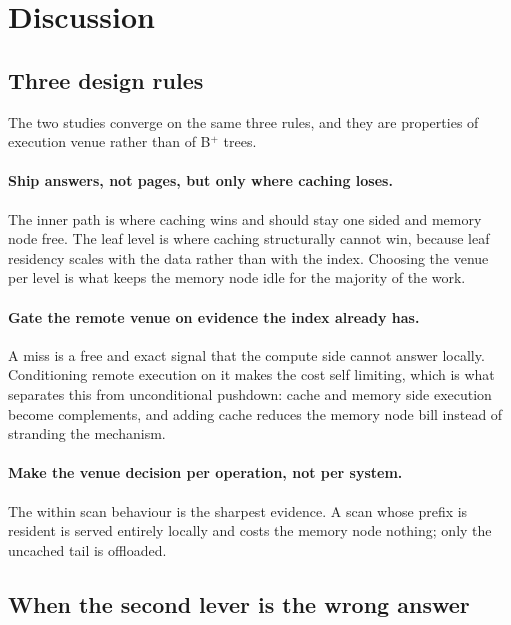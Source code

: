 \documentclass[sigconf,nonacm]{acmart}
\begin{document}
\section{Discussion}
\label{sec:discussion}

\subsection{Three design rules}

The two studies converge on the same three rules, and they are properties of
execution venue rather than of B$^+$ trees.

\paragraph{Ship answers, not pages, but only where caching loses.}
The inner path is where caching wins and should stay one sided and memory node
free. The leaf level is where caching structurally cannot win, because leaf
residency scales with the data rather than with the index. Choosing the venue per
level is what keeps the memory node idle for the majority of the work.

\paragraph{Gate the remote venue on evidence the index already has.}
A miss is a free and exact signal that the compute side cannot answer locally.
Conditioning remote execution on it makes the cost self limiting, which is what
separates this from unconditional pushdown: cache and memory side execution become
complements, and adding cache reduces the memory node bill instead of stranding
the mechanism.

\paragraph{Make the venue decision per operation, not per system.}
The within scan behaviour is the sharpest evidence. A scan whose prefix is
resident is served entirely locally and costs the memory node nothing; only the
uncached tail is offloaded.

\subsection{When the second lever is the wrong answer}
\end{document}
